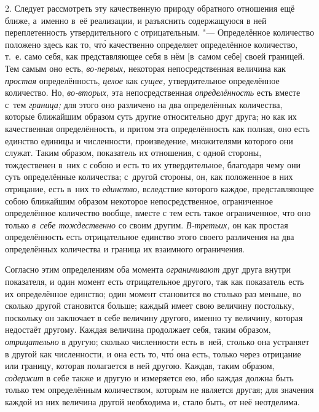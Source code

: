 2. Следует рассмотреть эту качественную природу обратного отношения ещё ближе,
а~именно в~её реализации, и разъяснить содержащуюся в ней переплетенность
утвердительного с отрицательным. "--- Определённое количество положено здесь
как то, чт\'{о} качественно определяет определённое количество, т.~е. само
себя, как представляющее себя в нём [в~самом себе] своей границей. Тем самым
оно есть, {\em во-первых,} некоторая непосредственная величина как
{\em простая} определённость, {\em целое} как {\em сущее,} утвердительное
определённое количество. Но, {\em во-вторых,} эта непосредственная
{\em определённость} есть вместе с~тем {\em граница;} для этого оно различено
на два определённых количества, которые ближайшим образом суть другие
относительно друг друга; но как их качественная определённость, и притом эта
определённость как полная, оно есть единство единицы и численности,
произведение, множителями которого они служат. Таким образом, показатель их
отношения, с одной стороны, тождественен в~них с собою и есть то их
утвердительное, благодаря чему они суть определённые количества; с~другой
стороны, он, как положенное в них отрицание, есть в~них то {\em единство,}
вследствие которого каждое, представляющее собою ближайшим образом некоторое
непосредственное, ограниченное определённое количество вообще, вместе с тем
есть такое ограниченное, что оно только {\em в~себе тождественно} со своим
другим. {\em В-третьих,} он как простая определённость есть отрицательное
единство этого своего различения на два определённых количества и граница их
взаимного ограничения.

Согласно этим определениям оба момента {\em ограничивают} друг друга внутри
показателя, и один момент есть отрицательное другого, так как показатель есть
их определённое единство; один момент становится во столько раз меньше, во
сколько другой становится больше; каждый имеет свою величину постольку,
поскольку он заключает в себе величину другого, именно ту величину, которая
недостаёт другому. Каждая величина продолжает себя, таким образом,
{\em отрицательно} в другую; сколько численности есть в~ней, столько она
устраняет в другой как численности, и она есть то, чт\'{о} она есть, только
через отрицание или границу, которая полагается в ней другою. Каждая, таким
образом, {\em содержит} в себе также и другую и измеряется ею, ибо каждая
должна быть только тем определённым количеством, которым не является другая;
для значения каждой из них величина другой необходима и, стало быть, от неё
неотделима.

